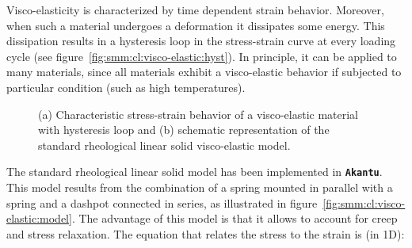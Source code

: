 \documentclass[a4paper,11pt]{book}
\newcommand{\akantu}{{\texttt{\textbf{Akantu}}}\xspace}
\begin{document}
Visco-elasticity is characterized by time dependent strain behavior. Moreover, when such a material undergoes a deformation it dissipates some energy. This dissipation results in a hysteresis loop in the stress-strain curve at every loading cycle (see figure~\ref{fig:smm:cl:visco-elastic:hyst}). In principle, it can be applied to many materials, since all materials exhibit a visco-elastic behavior if subjected to particular condition (such as high temperatures).
\begin{figure}[!htb]
  \begin{center}

    \hspace{0.05\textwidth}
    \caption{(a) Characteristic stress-strain behavior of a visco-elastic material with hysteresis loop and (b) schematic representation of the standard rheological linear solid visco-elastic model.}
    \label{fig:smm:cl:visco-elastic}
  \end{center}
\end{figure}
The standard rheological linear solid model has been implemented in \akantu. This model results from the combination of a spring mounted in parallel with a spring and a dashpot connected in series, as illustrated in figure~\ref{fig:smm:cl:visco-elastic:model}. The advantage of this model is that it allows to account for creep and stress relaxation. The equation that relates the stress to the strain is (in 1D):
\end{document}
